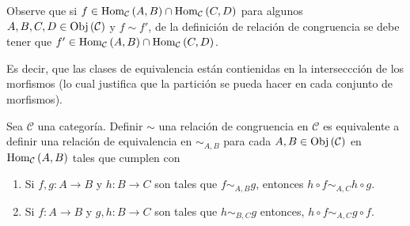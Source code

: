 \documentclass[12pt]{report}
\theoremstyle{largebreak}
\newcommand\cf[3]{\ensuremath{#1:#2\rightarrow#3}}
\newcommand{\Obj}[1]{\ensuremath{\textup{Obj}\left(#1\right)}}
\newcommand{\Hom}[3]{\ensuremath{\textup{Hom}_{#1}\left(#2,#3\right)}}
\begin{document}
    \begin{obs}
        Observe que si $f\in\Hom{\mathcal{C}}{A}{B}\cap\Hom{\mathcal{C}}{C}{D}$ para algunos $A,B,C,D\in\Obj{\mathcal{C}}$ y $f\sim f'$, de la definición de relación de congruencia se debe tener que $f'\in\Hom{\mathcal{C}}{A}{B}\cap\Hom{\mathcal{C}}{C}{D}$.

        Es decir, que las clases de equivalencia están contienidas en la interseccción de los morfismos (lo cual justifica que la partición se pueda hacer en cada conjunto de morfismos).
    \end{obs}

    \begin{propo}
        Sea $\mathcal{C}$ una categoría. Definir $\sim$ una relación de congruencia en $\mathcal{C}$ es equivalente a definir una relación de equivalencia en $\sim_{A,B}$ para cada $A,B\in\Obj{\mathcal{C}}$ en $\Hom{\mathcal{C}}{A}{B}$ tales que cumplen con
        \begin{enumerate}
            \item Si $\cf{f,g}{A}{B}$ y $\cf{h}{B}{C}$ son tales que $f\sim_{A,B}g$, entonces $h\circ f\sim_{A,C}h\circ g$.
            \item Si $\cf{f}{A}{B}$ y $\cf{g,h}{B}{C}$ son tales que $h\sim_{B,C}g$ entonces, $h\circ f\sim_{A,C}g\circ f$.
        \end{enumerate}
    \end{propo}
\end{document}
